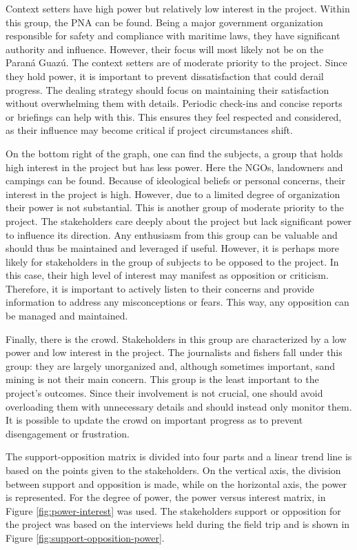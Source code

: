 Context setters have high power but relatively low interest in the project. Within this group, the PNA can be found. Being a major government organization responsible for safety and compliance with maritime laws, they have significant authority and influence. However, their focus will most likely not be on the Paraná Guazú. The context setters are of moderate priority to the project. Since they hold power, it is important to prevent dissatisfaction that could derail progress. The dealing strategy should focus on maintaining their satisfaction without overwhelming them with details. Periodic check-ins and concise reports or briefings can help with this. This ensures they feel respected and considered, as their influence may become critical if project circumstances shift.

On the bottom right of the graph, one can find the subjects, a group that holds high interest in the project but has less power. Here the NGOs, landowners and campings can be found. Because of ideological beliefs or personal concerns, their interest in the project is high. However, due to a limited degree of organization their power is not substantial. This is another group of moderate priority to the project. The stakeholders care deeply about the project but lack significant power to influence its direction. Any enthusiasm from this group can be valuable and should thus be maintained and leveraged if useful. However, it is perhaps more likely for stakeholders in the group of subjects to be opposed to the project. In this case, their high level of interest may manifest as opposition or criticism. Therefore, it is important to actively listen to their concerns and provide information to address any misconceptions or fears. This way, any opposition can be managed and maintained.

Finally, there is the crowd. Stakeholders in this group are characterized by a low power and low interest in the project. The journalists and fishers fall under this group: they are largely unorganized and, although sometimes important, sand mining is not their main concern. This group is the least important to the project's outcomes. Since their involvement is not crucial, one should avoid overloading them with unnecessary details and should instead only monitor them. It is possible to update the crowd on important progress as to prevent disengagement or frustration.

The support-opposition matrix is divided into four parts and a linear trend line is based on the points given to the stakeholders. On the vertical axis, the division between support and opposition is made, while on the horizontal axis, the power is represented. For the degree of power, the power versus interest matrix, in Figure \ref{fig:power-interest} was used. The stakeholders support or opposition for the project was based on the interviews held during the field trip and is shown in Figure \ref{fig:support-opposition-power}.

